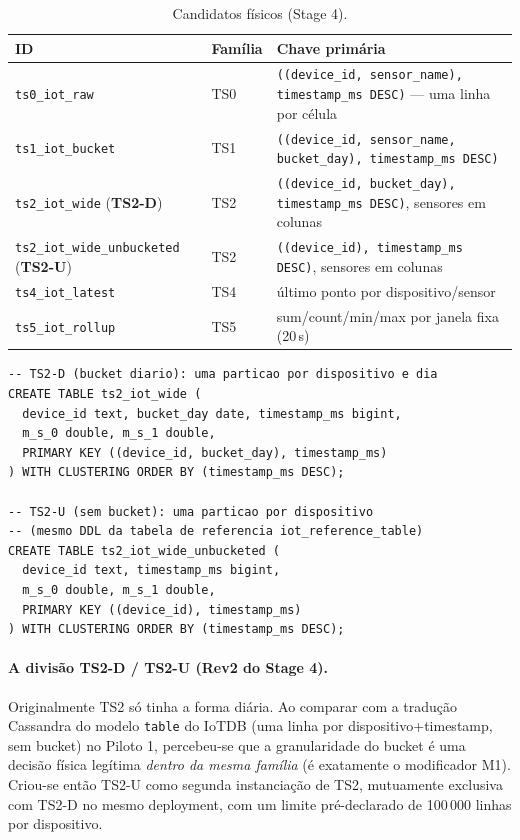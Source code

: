 \documentclass[11pt,a4paper]{article}
\begin{document}
\begin{table}[H]\centering\small
\caption{Candidatos físicos (Stage 4).}
\begin{tabularx}{\linewidth}{@{}llY@{}}\toprule
\textbf{ID} & \textbf{Família} & \textbf{Chave primária}\\\midrule
\texttt{ts0\_iot\_raw} & TS0 & \texttt{((device\_id, sensor\_name), timestamp\_ms DESC)} --- uma linha por célula\\
\texttt{ts1\_iot\_bucket} & TS1 & \texttt{((device\_id, sensor\_name, bucket\_day), timestamp\_ms DESC)}\\
\texttt{ts2\_iot\_wide} (\textbf{TS2-D}) & TS2 & \texttt{((device\_id, bucket\_day), timestamp\_ms DESC)}, sensores em colunas\\
\texttt{ts2\_iot\_wide\_unbucketed} (\textbf{TS2-U}) & TS2 & \texttt{((device\_id), timestamp\_ms DESC)}, sensores em colunas\\
\texttt{ts4\_iot\_latest} & TS4 & último ponto por dispositivo/sensor\\
\texttt{ts5\_iot\_rollup} & TS5 & sum/count/min/max por janela fixa (20\,s)\\\bottomrule
\end{tabularx}\end{table}

\begin{lstlisting}
-- TS2-D (bucket diario): uma particao por dispositivo e dia
CREATE TABLE ts2_iot_wide (
  device_id text, bucket_day date, timestamp_ms bigint,
  m_s_0 double, m_s_1 double,
  PRIMARY KEY ((device_id, bucket_day), timestamp_ms)
) WITH CLUSTERING ORDER BY (timestamp_ms DESC);

-- TS2-U (sem bucket): uma particao por dispositivo
-- (mesmo DDL da tabela de referencia iot_reference_table)
CREATE TABLE ts2_iot_wide_unbucketed (
  device_id text, timestamp_ms bigint,
  m_s_0 double, m_s_1 double,
  PRIMARY KEY ((device_id), timestamp_ms)
) WITH CLUSTERING ORDER BY (timestamp_ms DESC);
\end{lstlisting}

\paragraph{A divisão TS2-D / TS2-U (Rev2 do Stage 4).} Originalmente TS2 só tinha a forma diária. Ao comparar com a tradução Cassandra do modelo \texttt{table} do IoTDB (uma linha por dispositivo+timestamp, sem bucket) no Piloto 1, percebeu-se que a granularidade do bucket é uma decisão física legítima \emph{dentro da mesma família} (é exatamente o modificador M1). Criou-se então TS2-U como segunda instanciação de TS2, mutuamente exclusiva com TS2-D no mesmo deployment, com um limite pré-declarado de 100\,000 linhas por dispositivo.
\end{document}
